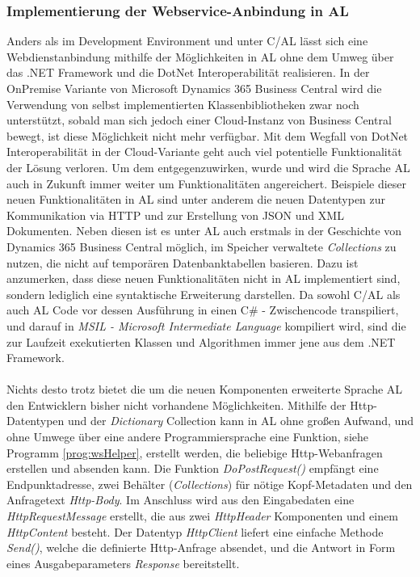 \subsubsection{Implementierung der Webservice-Anbindung in AL}
Anders als im Development Environment und unter C/AL lässt sich eine Webdienstanbindung mithilfe der Möglichkeiten in AL ohne dem Umweg über das .NET Framework und die DotNet Interoperabilität realisieren. In der OnPremise Variante von Microsoft Dynamics 365 Business Central wird die Verwendung von selbst implementierten Klassenbibliotheken zwar noch unterstützt, sobald man sich jedoch einer Cloud-Instanz von Business Central bewegt, ist diese Möglichkeit nicht mehr verfügbar. Mit dem Wegfall von DotNet Interoperabilität in der Cloud-Variante geht auch viel potentielle Funktionalität der Lösung verloren. Um dem entgegenzuwirken, wurde und wird die Sprache AL auch in Zukunft immer weiter um Funktionalitäten angereichert. Beispiele dieser neuen Funktionalitäten in AL sind unter anderem die neuen Datentypen zur Kommunikation via HTTP und zur Erstellung von JSON und XML Dokumenten. Neben diesen ist es unter AL auch erstmals in der Geschichte von Dynamics 365 Business Central möglich, im Speicher verwaltete \textit{Collections} zu nutzen, die nicht auf temporären Datenbanktabellen basieren. Dazu ist anzumerken, dass diese neuen Funktionalitäten nicht in AL implementiert sind, sondern lediglich eine syntaktische Erweiterung darstellen. Da sowohl C/AL als auch AL Code vor dessen Ausführung in einen C\# - Zwischencode transpiliert, und darauf in \textit{MSIL - Microsoft Intermediate Language} kompiliert wird, sind die zur Laufzeit exekutierten Klassen und Algorithmen immer jene aus dem .NET Framework. \linebreak

\paragraph{}
Nichts desto trotz bietet die um die neuen Komponenten erweiterte Sprache AL den Entwicklern bisher nicht vorhandene Möglichkeiten. Mithilfe der Http-Datentypen und der \textit{Dictionary} Collection kann in AL ohne großen Aufwand, und ohne Umwege über eine andere Programmiersprache eine Funktion, siehe Programm \ref{prog:wsHelper}, erstellt werden, die beliebige Http-Webanfragen erstellen und absenden kann. Die Funktion \textit{DoPostRequest()} empfängt eine Endpunktadresse, zwei Behälter (\textit{Collections}) für nötige Kopf-Metadaten und den Anfragetext \textit{Http-Body}. Im Anschluss wird aus den Eingabedaten eine \textit{HttpRequestMessage} erstellt, die aus zwei \textit{HttpHeader} Komponenten und einem \textit{HttpContent} besteht. Der Datentyp \textit{HttpClient} liefert eine einfache Methode \textit{Send()}, welche die definierte Http-Anfrage absendet, und die Antwort in Form eines Ausgabeparameters \textit{Response} bereitstellt.


